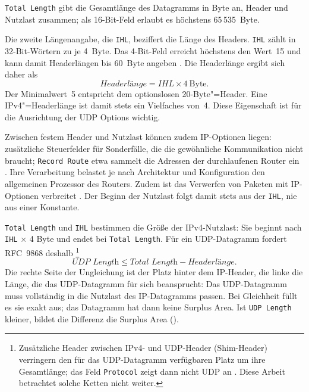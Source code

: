 \texttt{Total Length} gibt die Gesamtlänge des Datagramms in Byte an, Header und Nutzlast zusammen;
als 16-Bit-Feld erlaubt es höchstens 65\,535~Byte.

Die zweite Längenangabe, die \texttt{IHL}, beziffert die Länge des Headers.
\texttt{IHL} zählt in 32-Bit-Wörtern zu je 4~Byte. Das 4-Bit-Feld erreicht höchstens den Wert~15 und kann
damit Headerlängen bis 60~Byte angeben \cite{rfc791}. Die Headerlänge ergibt sich daher als
\begin{equation}
  \textit{Headerlänge} = \textit{IHL} \times 4~\mbox{Byte}.
  \label{eq:ihl-headerlaenge}
\end{equation}
Der Minimalwert~5 entspricht dem optionslosen 20-Byte"=Header. Eine IPv4"=Headerlänge ist damit stets ein
Vielfaches von~4. Diese Eigenschaft ist für die Ausrichtung der UDP Options wichtig.

Zwischen festem Header und Nutzlast können zudem IP-Optionen liegen: zusätzliche Steuerfelder für
Sonderfälle, die die gewöhnliche Kommunikation nicht braucht; \texttt{Record Route} etwa sammelt die
Adressen der durchlaufenen Router ein \cite{rfc791}.
Ihre Verarbeitung belastet je nach Architektur und Konfiguration den allgemeinen Prozessor des Routers.
Zudem ist das Verwerfen von Paketen mit IP-Optionen verbreitet \cite[Sec.~1 und 3.1]{rfc7126}.
Der Beginn der Nutzlast folgt damit stets aus der \texttt{IHL}, nie aus einer Konstante.

\texttt{Total Length} und \texttt{IHL} bestimmen die Größe der IPv4-Nutzlast: Sie beginnt nach
\texttt{IHL} $\times$ 4 Byte und endet bei \texttt{Total Length}. Für ein UDP-Datagramm fordert RFC~9868
deshalb \cite[Sec.~7]{rfc9868}\footnote{Zusätzliche Header zwischen IPv4- und UDP-Header (Shim-Header)
verringern den für das UDP-Datagramm verfügbaren Platz um ihre Gesamtlänge; das Feld \texttt{Protocol}
zeigt dann nicht UDP an \cite[Sec.~7]{rfc9868}. Diese Arbeit betrachtet solche Ketten nicht weiter.}
\begin{equation}
  \textit{UDP Length} \leq \textit{Total Length} - \textit{Headerlänge}.
  \label{eq:udp-length-obergrenze}
\end{equation}
Die rechte Seite der Ungleichung ist der Platz hinter dem IP-Header, die linke die Länge, die das
UDP-Datagramm für sich beansprucht: Das UDP-Datagramm muss vollständig in die Nutzlast des IP-Datagramms
passen. Bei Gleichheit füllt es sie exakt aus; das Datagramm hat dann keine Surplus Area. Ist
\texttt{UDP Length} kleiner, bildet die Differenz die Surplus Area ().

